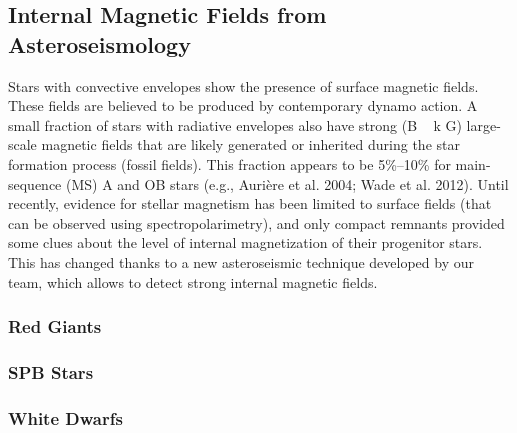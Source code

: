 {\color{red}
\subsection{Internal Magnetic Fields from Asteroseismology}
Stars with convective envelopes show the presence of
surface magnetic fields. These fields are believed to be produced by contemporary dynamo action.
A small fraction of stars with radiative envelopes also have strong (B ~ k G)
large-scale magnetic fields that are likely generated or inherited during the star
formation process (fossil fields). This fraction appears to be 5\%–10\% for main-sequence (MS)
A and OB stars (e.g., Aurière et al. 2004; Wade et al. 2012).
Until recently, evidence for stellar magnetism has been limited to surface fields (that can be observed using spectropolarimetry),
and only compact remnants provided some clues about the level of internal magnetization of their progenitor stars.
This has changed thanks to a new asteroseismic technique developed by our team, which allows to detect strong internal magnetic fields.


\subsubsection{Red Giants}

\subsubsection{SPB Stars}

\subsubsection{White Dwarfs}



}